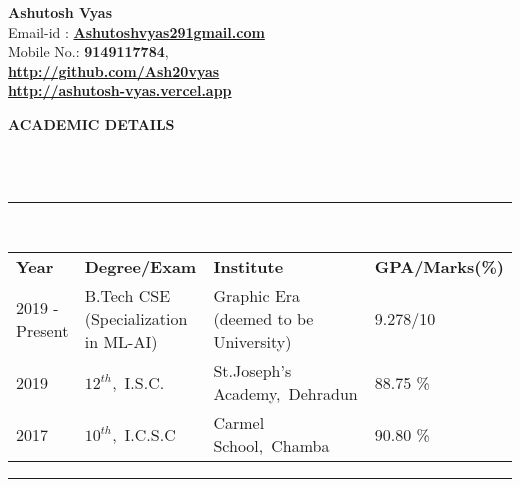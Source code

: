 \documentclass[a4paper,10pt]{article}
\newcommand{\lsep}{-0.5cm}
\newcommand{\resheading}[1]{{\small \colorbox{mygrey}{\begin{minipage}{0.975\textwidth}{\textbf{#1 \vphantom{p\^{E}}}}\end{minipage}}}}
\begin{document}
\textbf{Ashutosh Vyas} \\
\indent Email-id : \textbf{\url{Ashutoshvyas291gmail.com}} \\
\indent Mobile No.: \textbf{9149117784}, \ \\
\indent \textbf{\url{http://github.com/Ash20vyas}}\\
\indent \textbf{\url{http://ashutosh-vyas.vercel.app}}\\

\resheading{\textbf{ACADEMIC DETAILS} }\\[\lsep]
\\
\indent \rule{6.94in}{0.4pt}\\
\indent \begin{tabular}{ l @{\hskip 0.15in} l @{\hskip 0.15in} l @{\hskip 0.15in} l @{\hskip 0.15in} }
\noindent \textbf{Year} & \textbf{Degree/Exam} & \textbf{Institute} & \textbf{GPA/Marks(\%)}\\
2019 - Present & B.Tech CSE (Specialization in ML-AI) & Graphic Era (deemed to be University) & 9.278/10 \\
2019 & $12^{th}$,\ I.S.C. & St.Joseph's Academy,\ Dehradun & 88.75 \% \\
2017 & $10^{th}$,\ I.C.S.C & Carmel School,\ Chamba & 90.80 \%\\

\end{tabular}
\indent \rule{6.94in}{0.4pt}
\\
\end{document}
